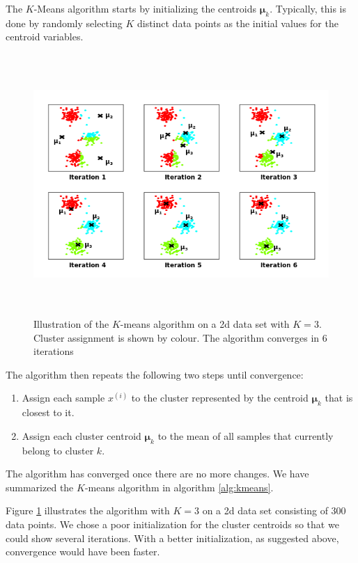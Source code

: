 \documentclass[final,3p,times,twocolumn]{elsarticle}
\let\bs\boldsymbol
\begin{document}
The $K$-Means algorithm starts by initializing the centroids $\boldsymbol \mu_k$.
Typically, this is done by randomly selecting $K$ distinct data points as the initial values for the centroid variables.

\begin{figure}
\centering
\includegraphics[width=\textwidth,height=3.9in]{prog.png}
\caption{Illustration of the $K$-means algorithm on a 2d data set with $K=3$.
Cluster assignment is shown by colour. The algorithm converges in 6 iterations}
\label{fig:kmeans-prog}
\end{figure}

The algorithm then repeats the following two steps until convergence:
\begin{enumerate}
\item Assign each sample $x^{(i)}$ to the cluster represented by the centroid $\bs\mu_k$ that is closest to it.
\item Assign each cluster centroid $\bs\mu_k$ to the mean of all samples that currently belong to cluster $k$.
\end{enumerate}
The algorithm has converged once there are no more changes.
We have summarized the $K$-means algorithm in algorithm \ref{alg:kmeans}.

Figure \ref{fig:kmeans-prog} illustrates the algorithm with $K=3$ on a 2d data set consisting of 300 data points.
We chose a poor initialization for the cluster centroids so that we could show several iterations. 
With a better initialization, as suggested above, convergence would have been faster.
\end{document}
